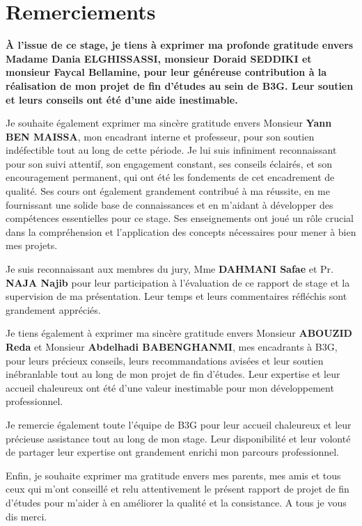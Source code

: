 \chapter*{Remerciements}
\bf \normalfont
\hspace{\parindent} À l'issue de ce stage, je tiens à exprimer ma profonde gratitude envers Madame \textbf{Dania ELGHISSASSI}, monsieur \textbf{Doraid SEDDIKI} et monsieur \textbf{Faycal Bellamine}, pour leur généreuse contribution à la réalisation de mon projet de fin d'études au sein de B3G. Leur soutien et leurs conseils ont été d'une aide inestimable.

Je souhaite également exprimer ma sincère gratitude envers Monsieur \textbf{Yann BEN MAISSA}, mon encadrant interne et professeur, pour son soutien indéfectible tout au long de cette période. Je lui suis infiniment reconnaissant pour son suivi attentif, son engagement constant, ses conseils éclairés, et son encouragement permanent, qui ont été les fondements de cet encadrement de qualité. Ses cours ont également grandement contribué à ma réussite, en me fournissant une solide base de connaissances et en m'aidant à développer des compétences essentielles pour ce stage. Ses enseignements ont joué un rôle crucial dans la compréhension et l'application des concepts nécessaires pour mener à bien mes projets.

Je suis reconnaissant aux membres du jury, Mme \textbf{DAHMANI Safae} et Pr. \textbf{NAJA Najib} pour leur participation à l'évaluation de ce rapport de stage et la supervision de ma présentation. Leur temps et leurs commentaires réfléchis sont grandement appréciés.

Je tiens également à exprimer ma sincère gratitude envers Monsieur \textbf{ABOUZID Reda} et Monsieur \textbf{Abdelhadi BABENGHANMI}, mes encadrants à B3G, pour leurs précieux conseils, leurs recommandations avisées et leur soutien inébranlable tout au long de mon projet de fin d’études. Leur expertise et leur accueil chaleureux ont été d'une valeur inestimable pour mon développement professionnel.


Je remercie également toute l'équipe de B3G pour leur accueil chaleureux et leur précieuse assistance tout au long de mon stage. Leur disponibilité et leur volonté de partager leur expertise ont grandement enrichi mon parcours professionnel.

Enfin, je souhaite exprimer ma gratitude envers mes parents, mes amis et tous ceux qui m'ont conseillé et relu attentivement le présent rapport de projet de fin d’études pour m’aider à en améliorer la qualité et la consistance. A tous je vous dis merci.

